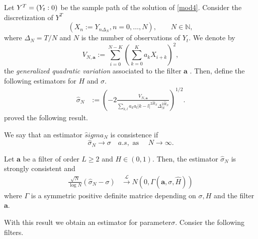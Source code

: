 \documentclass[smallextended]{svjour3}
\newcommand{\IN}{{\mathbb N}}
\begin{document}
    Let $Y^T=(Y_t: 0 \let \le T)$ be  the sample path of the solution of
    \eqref{mod4}. Consider the discretization of $Y^T$
    \[
        (X_n:=Y_{n\Delta_N}, n=0,\ldots,N),\qquad
        N\in \IN,
    \]
    where $\Delta_N=T/N$ and $N$ is the number of observations of $Y_t$. 
    We denote by
    \begin{equation*}
        V_{N,\bm{a}}:= 
        \sum_{i=0} ^ {N - K}
            \left( 
                \sum_{k=0} ^ K a_k X_{i+k} 
            \right)^2,
    \end{equation*}
    the \emph{generalized quadratic variation} associated to the filter $\bm{a}$
    \citet[see, for example][]{is-la}. Then, define the
    following estimators for $H$ and $\sigma$.
    \begin{align}
        \hat{\sigma}_N
            &:=\left(
                -2
                \frac{V_{N,\bm{a}}}{\sum_{k,l} a_ka_l |k-l|^{2\hat{H}_N} 
                \Delta_N^{2 \hat{H}_N } }\right)^{1/2}.
            \label{est2}
    \end{align}
    \citet[][]{br-ia} proved the following result.
    \begin{definition}
        We say that an estimator $\widehat sigma_N$ is consistence if
        \[
            \widehat{\sigma}_N 
            \to
            \sigma \quad a.s, \text{ as } \quad N \to \infty.
        \]
    \end{definition}
    \begin{theorem}
        Let  $\bm{a}$ be a filter of order $L \ge 2$ and $H \in (0, 1)$. Then, the  estimator
        $\hat{\sigma}_N$  is strongly consistent and
        \begin{align*}
            \frac{\sqrt{N}}{\log N} ( \widehat{\sigma}_N  - \sigma )
            &
            \stackrel{\mathcal{L}}{\to} N (0, \Gamma(\bm{a},\sigma, \widehat H))
        \end{align*}
%
        where $\Gamma$ is a symmetric positive definite matrice
        depending on $\sigma, H$ and the filter $\bm{a}$.
    \end{theorem}

    With this result we obtain an estimator for parameter$\sigma$.
    Consier the following filters.
\end{document}
